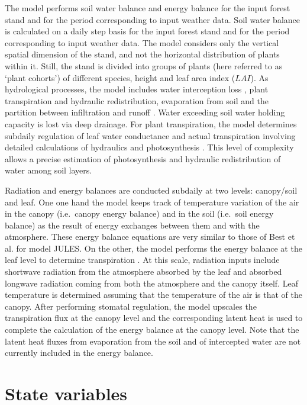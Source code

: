 \documentclass[]{book}
\begin{document}
The model performs soil water balance and energy balance for the input
forest stand and for the period corresponding to input weather data.
Soil water balance is calculated on a daily step basis for the input
forest stand and for the period corresponding to input weather data. The
model considers only the vertical spatial dimension of the stand, and
not the horizontal distribution of plants within it. Still, the stand is
divided into groups of plants (here referred to as `plant cohorts') of
different species, height and leaf area index (\(LAI\)). As hydrological
processes, the model includes water interception loss \citep{Gash1995},
plant transpiration and hydraulic redistribution, evaporation from soil
\citep{Ritchie1972} and the partition between infiltration and runoff
\citep{Boughton1989}. Water exceeding soil water holding capacity is
lost via deep drainage. For plant transpiration, the model determines
subdaily regulation of leaf water conductance and actual transpiration
involving detailed calculations of hydraulics and photosynthesis
\citep{Sperry2016}. This level of complexity allows a precise estimation
of photosynthesis and hydraulic redistribution of water among soil
layers.

Radiation and energy balances are conducted subdaily at two levels:
canopy/soil and leaf. One one hand the model keeps track of temperature
variation of the air in the canopy (i.e.~canopy energy balance) and in
the soil (i.e.~soil energy balance) as the result of energy exchanges
between them and with the atmosphere. These energy balance equations are
very similar to those of Best et al. \citeyearpar{Best2011} for model
JULES. On the other, the model performs the energy balance at the leaf
level to determine transpiration \citep{Sperry2016}. At this scale,
radiation inputs include shortwave radiation from the atmosphere
absorbed by the leaf and absorbed longwave radiation coming from both
the atmosphere and the canopy itself. Leaf temperature is determined
assuming that the temperature of the air is that of the canopy. After
performing stomatal regulation, the model upscales the transpiration
flux at the canopy level and the corresponding latent heat is used to
complete the calculation of the energy balance at the canopy level. Note
that the latent heat fluxes from evaporation from the soil and of
intercepted water are not currently included in the energy balance.

\section{State variables}\label{state-variables-1}
\end{document}
